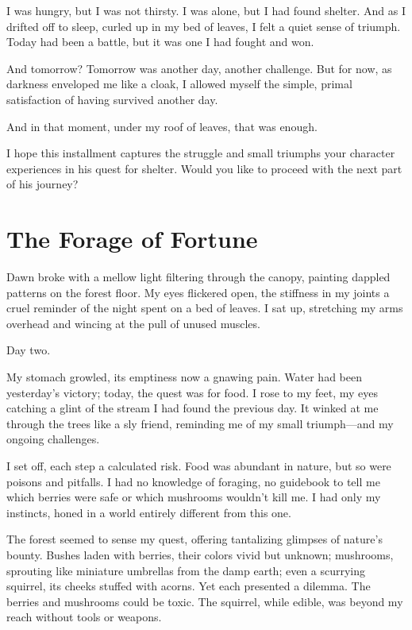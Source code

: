\documentclass[]{article}
\begin{document}
I was hungry, but I was not thirsty. I was alone, but I had found shelter. And as I drifted off to sleep, curled up in my bed of leaves, I felt a quiet sense of triumph. Today had been a battle, but it was one I had fought and won.

And tomorrow? Tomorrow was another day, another challenge. But for now, as darkness enveloped me like a cloak, I allowed myself the simple, primal satisfaction of having survived another day.

And in that moment, under my roof of leaves, that was enough.

I hope this installment captures the struggle and small triumphs your character experiences in his quest for shelter. Would you like to proceed with the next part of his journey?


\section{The Forage of Fortune}


Dawn broke with a mellow light filtering through the canopy, painting dappled patterns on the forest floor. My eyes flickered open, the stiffness in my joints a cruel reminder of the night spent on a bed of leaves. I sat up, stretching my arms overhead and wincing at the pull of unused muscles.

Day two.

My stomach growled, its emptiness now a gnawing pain. Water had been yesterday's victory; today, the quest was for food. I rose to my feet, my eyes catching a glint of the stream I had found the previous day. It winked at me through the trees like a sly friend, reminding me of my small triumph—and my ongoing challenges.

I set off, each step a calculated risk. Food was abundant in nature, but so were poisons and pitfalls. I had no knowledge of foraging, no guidebook to tell me which berries were safe or which mushrooms wouldn't kill me. I had only my instincts, honed in a world entirely different from this one.

The forest seemed to sense my quest, offering tantalizing glimpses of nature's bounty. Bushes laden with berries, their colors vivid but unknown; mushrooms, sprouting like miniature umbrellas from the damp earth; even a scurrying squirrel, its cheeks stuffed with acorns. Yet each presented a dilemma. The berries and mushrooms could be toxic. The squirrel, while edible, was beyond my reach without tools or weapons.
\end{document}
